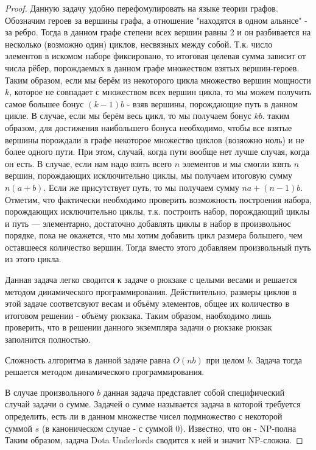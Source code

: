 \documentclass{article}
\begin{document}
\begin{proof}
 Данную задачу удобно перефомулировать на языке теории графов. Обозначим героев за вершины графа, а отношение "находятся в одном альянсе" - за ребро. Тогда в данном графе степени всех вершин равны 2 и он разбивается на несколько (возможно один) циклов, несвязных между собой. Т.к. число элементов в искомом наборе фиксировано, то итоговая целевая сумма зависит от числа рёбер, порождаемых в данном графе множеством взятых вершин-героев. Таким образом, если мы берём из некоторого цикла множество вершин мощности $k$, которое не совпадает с множеством всех вершин цикла, то мы можем получить самое большее бонус $(k-1)b$ - взяв вершины, порождающие путь в данном цикле. В случае, если мы берём весь цикл, то мы получаем бонус $kb$. таким образом, для достижения наибольшего бонуса необходимо, чтобы все взятые вершины порождали в графе некоторое множество циклов (возяожно ноль) и не более одного пути. При этом, случай, когда пути вообще нет лучше случая, когда он есть. В случае, если нам надо взять всего $n$ элементов и мы смогли взять $n$ вершин, порождающих исключительно циклы, мы получаем итоговую сумму $n(a+b)$. Если же присутствует путь, то мы получаем сумму $na+(n-1)b$. Отметим, что фактически необходимо проверить возможность построения набора, порождающих исключительно циклы, т.к. построить набор, порождающий циклы и путь --- элементарно, достаточно добавлять циклы в набор в произвольнос порядке, пока не окажется, что мы хотим добавить цикл размера большего, чем оставшееся количество вершин. Тогда вместо этого добавляем произвольный путь из этого цикла. 
 
 Данная задача легко сводится к задаче о рюкзаке с целыми весами и решается методом динамического программирования. Действительно, размеры циклов в этой задаче соответсвуют весам и объёму элементов, общее их количество в итоговом решении - объёму рюкзака. Таким образом, наобходимо лишь проверить, что в решении данного экземпляра задачи о рюкзаке рюкзак заполнится полностью.
 
 Сложность алгоритма  в данной задаче равна $O(nb)$ при целом $b$. Задача тогда решается методом динамического программирования.
 
 В случае произвольного $b$ данная задача представлет собой специфический случай задачи о сумме. Задачей о сумме называется задача в которой требуется определить, есть ли в данном множестве чисел подмножество с некоторой суммой $s$ (в каноническом случае - с суммой 0). Известно, что он - NP-полна Таким образом, задача Dota Underlords сводится к ней и значит NP-сложна. 
\end{proof}
\end{document}
